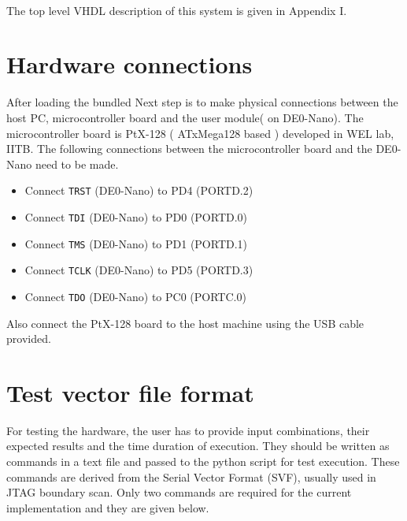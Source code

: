 \documentclass[a4paper,11pt]{article}
\begin{document}
\paragraph*{}
The top level VHDL description of this system is given in Appendix I.


\section{Hardware connections}
After loading the bundled Next step is to make physical connections between the host PC, microcontroller board and the user module( on DE0-Nano). The microcontroller board is PtX-128 ( ATxMega128 based ) developed in WEL lab, IITB. The following connections between the microcontroller board and the DE0-Nano need to be made.

\begin{itemize}
\item Connect \texttt{TRST} (DE0-Nano) to PD4 (PORTD.2)
\item Connect \texttt{TDI} (DE0-Nano) to PD0 (PORTD.0)
\item Connect \texttt{TMS} (DE0-Nano) to PD1 (PORTD.1)
\item Connect \texttt{TCLK} (DE0-Nano) to PD5 (PORTD.3)
\item Connect \texttt{TDO} (DE0-Nano) to PC0 (PORTC.0)
\end{itemize}

Also connect the PtX-128 board to the host machine using the USB cable provided.

\section{Test vector file format}
For testing the hardware, the user has to provide input combinations, their expected results and the time duration of execution. They should be written as commands in a text file and passed to the python script for test execution. These commands are derived from the Serial Vector Format (SVF)\cite{svf}, usually used in JTAG boundary scan. Only two commands are required for the current implementation and they are given below.
\end{document}
